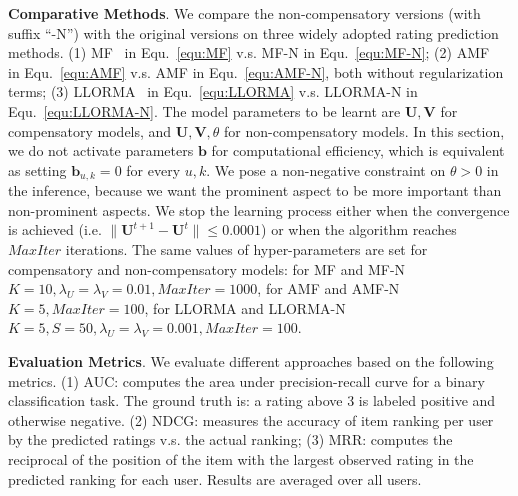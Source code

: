 \documentclass[letterpaper]{article} %
\begin{document}
\textbf{Comparative Methods}. We compare the non-compensatory versions (with suffix ``-N'') with the original versions on three widely adopted rating prediction methods. (1) MF~\cite{Koren2009Matrix} in Equ.~\ref{equ:MF} v.s. MF-N in Equ.~\ref{equ:MF-N};  (2) AMF~\cite{Koren2008Factorization} in Equ.~\ref{equ:AMF} v.s. AMF in Equ.~\ref{equ:AMF-N}, both without regularization terms; (3) LLORMA~\cite{Lee2016LLORMA} in Equ.~\ref{equ:LLORMA} v.s. LLORMA-N in Equ.~\ref{equ:LLORMA-N}. The model parameters to be learnt are $\mathbf{U},\mathbf{V}$ for compensatory models, and  $\mathbf{U},\mathbf{V},\theta$ for non-compensatory models. In this section, we do not activate parameters $\mathbf{b}$ for computational efficiency, which is equivalent as setting $\mathbf{b}_{u,k}=0$ for every $u,k$. We pose a non-negative constraint on $\theta>0$ in the inference, because we want the prominent aspect to be more important than non-prominent aspects. We stop the learning process either when the convergence is achieved (i.e. $\|\mathbf{U}^{t+1}-\mathbf{U}^t\|\leq 0.0001$) or when the algorithm reaches $MaxIter$ iterations. The same values of hyper-parameters are set for compensatory and non-compensatory models: for MF and MF-N $K=10, \lambda_U=\lambda_V=0.01, MaxIter=1000$, for AMF and AMF-N $K=5, MaxIter=100$, for LLORMA and LLORMA-N $K=5, S=50, \lambda_U=\lambda_V=0.001, MaxIter=100$.

\textbf{Evaluation Metrics}.  We evaluate different approaches based on the following metrics. (1) AUC: computes the area under precision-recall curve for a binary classification task.  The ground truth is: a rating above 3 is labeled positive and otherwise negative. (2) NDCG: measures the accuracy of item ranking per user by the predicted ratings v.s. the actual ranking; (3)  MRR: computes the reciprocal of the position of the item with the largest observed rating in the predicted ranking for each user. Results are averaged over all users. 
\end{document}
